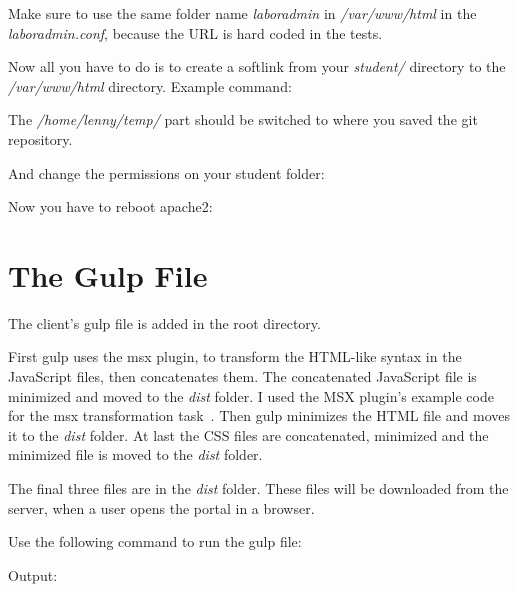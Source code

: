 Make sure to use the same folder name \emph{laboradmin} in \emph{/var/www/html} in the \emph{laboradmin.conf}, because the URL is hard coded in the tests.

Now all you have to do is to create a softlink from your\emph{ student/} directory to the \emph{/var/www/html} directory. Example command:

	
The \emph{/home/lenny/temp/} part should be switched to where you saved the git repository.

And change the permissions on your student folder:


Now you have to reboot apache2:


\section{The Gulp File}\label{gulp-file}
The client's gulp file is added in the root directory. 

First gulp uses the msx plugin, to transform the HTML-like syntax in the JavaScript files, then concatenates them. The concatenated JavaScript file is minimized and moved to the \emph{dist} folder. I used the MSX plugin's example code for the msx transformation task~\cite{gulp-msx-example}. Then gulp minimizes the HTML file and moves it to the \emph{dist} folder. At last the CSS files are concatenated, minimized and the minimized file is moved to the \emph{dist} folder. 

The final three files are in the \emph{dist} folder. These files will be downloaded from the server, when a user opens the portal in a browser.

Use the following command to run the gulp file:


Output:


